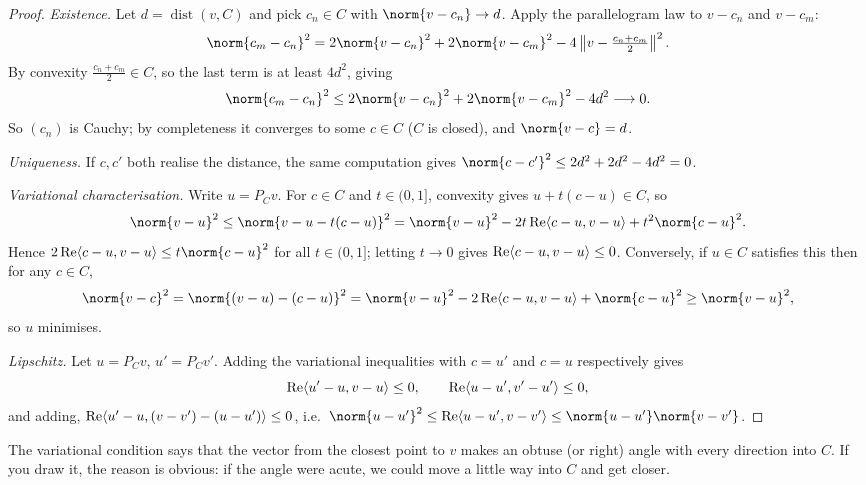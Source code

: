 \documentclass[a4paper]{scrartcl}
\newcommand{\ip}[2]{\langle #1, #2 \rangle}
\DeclareMathOperator{\dist}{dist}
\begin{document}
\begin{proof}
	\emph{Existence.} Let $d = \dist(v,C)$ and pick $c_n \in C$ with $\norm{v - c_n}\to d$. Apply the parallelogram law to $v - c_n$ and $v - c_m$:
	$$\norm{c_m - c_n}^2 = 2\norm{v-c_n}^2 + 2\norm{v-c_m}^2 - 4\left\|v - \tfrac{c_n+c_m}{2}\right\|^2.$$
	By convexity $\frac{c_n+c_m}{2} \in C$, so the last term is at least $4d^2$, giving
	$$\norm{c_m-c_n}^2 \leq 2\norm{v-c_n}^2 + 2\norm{v-c_m}^2 - 4d^2 \longrightarrow 0.$$
	So $(c_n)$ is Cauchy; by completeness it converges to some $c \in C$ ($C$ is closed), and $\norm{v-c}=d$.

	\emph{Uniqueness.} If $c, c'$ both realise the distance, the same computation gives $\norm{c-c'}^2 \leq 2d^2+2d^2-4d^2 = 0$.

	\emph{Variational characterisation.} Write $u = P_Cv$. For $c \in C$ and $t \in (0,1]$, convexity gives $u + t(c-u) \in C$, so
	$$\norm{v-u}^2 \leq \norm{v - u - t(c-u)}^2 = \norm{v-u}^2 - 2t\re\ip{c-u}{v-u} + t^2\norm{c-u}^2.$$
	Hence $2\re\ip{c-u}{v-u} \leq t\norm{c-u}^2$ for all $t \in (0,1]$; letting $t \to 0$ gives $\re\ip{c-u}{v-u}\leq0$. Conversely, if $u \in C$ satisfies this then for any $c \in C$,
	$$\norm{v-c}^2 = \norm{(v-u)-(c-u)}^2 = \norm{v-u}^2 - 2\re\ip{c-u}{v-u}+\norm{c-u}^2 \geq \norm{v-u}^2,$$
	so $u$ minimises.

	\emph{Lipschitz.} Let $u = P_Cv$, $u' = P_Cv'$. Adding the variational inequalities with $c = u'$ and $c = u$ respectively gives
	$$\re\ip{u'-u}{v-u} \leq 0, \qquad \re\ip{u-u'}{v'-u'}\leq 0,$$
	and adding, $\re\ip{u'-u}{(v-v')-(u-u')}\leq0$, i.e.\ $\norm{u-u'}^2 \leq \re\ip{u-u'}{v-v'}\leq \norm{u-u'}\norm{v-v'}$.
\end{proof}

The variational condition says that the vector from the closest point to $v$ makes an obtuse (or right) angle with every direction into $C$. If you draw it, the reason is obvious: if the angle were acute, we could move a little way into $C$ and get closer.

\begin{center}
\end{center}
\end{document}
